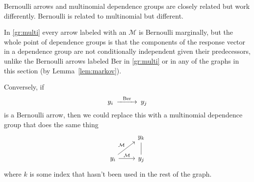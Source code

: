 Bernoulli arrows and multinomial dependence groups are closely related but
work differently.  Bernoulli is related to multinomial but different.

In \eqref{gr:multi} every arrow labeled with an $\mathcal{M}$ is Bernoulli
marginally, but the whole point of dependence groups is that the components
of the response vector in a dependence group are not
conditionally independent given their predecessors, unlike the Bernoulli
arrows labeled Ber in \eqref{gr:multi} or in any of the graphs in this
section (by Lemma~\ref{lem:markov}).

Conversely, if
$$
\begin{CD}
   y_i @>\text{Ber}>> y_j
\end{CD}
$$
is a Bernoulli arrow, then we could replace this with a multinomial dependence
group that does the same thing
$$
\begin{tikzcd}
  \hphantom{1} & y_k
  \\
  y_i
  \arrow{r}{\mathcal{M}}
  \arrow{ru}{\mathcal{M}}
  & y_j
  \arrow[dash]{u}
\end{tikzcd}
$$
where $k$ is some index that hasn't been used in the rest of the graph.

